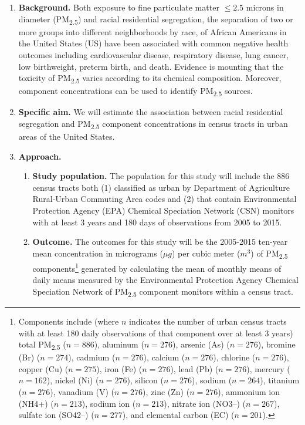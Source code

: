 \documentclass{article}\usepackage[]{graphicx}\usepackage[]{color}
\title{\vspace{-1cm}}
\author{\textbf{Midterm Examination} \\ \textbf{Katherine Wolf} \\ PH250C Spring 2020 \\ March 31, 2020}
\date{}
\begin{document}
\maketitle

\vspace{-.5cm}

\begin{enumerate}[label=\textbf{\arabic*.}]

  \item \textbf{Background.} Both exposure to fine particulate matter $\leq 2.5$ microns in diameter (PM\textsubscript{2.5}) and racial residential segregation, the separation of two or more groups into different neighborhoods by race, of African Americans in the United States (US) have been associated with common negative health outcomes including cardiovascular disease, respiratory disease, lung cancer, low birthweight, preterm birth, and death. Evidence is mounting that the toxicity of PM\textsubscript{2.5} varies according to its chemical composition. Moreover, component concentrations can be used to identify PM\textsubscript{2.5} sources.
  
  \item \textbf{Specific aim.} We will estimate the association between racial residential segregation and PM\textsubscript{2.5} component concentrations in census tracts in urban areas of the United States.
  \item \textbf{Approach.}
  
  \begin{enumerate}[label=\textbf{\alph*.}]
    
    \item \textbf{Study population.} The population for this study will include the 886 census tracts both (1) classified as urban by Department of Agriculture Rural-Urban Commuting Area codes and (2) that contain Environmental Protection Agency (EPA) Chemical Speciation Network (CSN) monitors with at least 3 years and 180 days of observations from 2005 to 2015.
    
    \item \textbf{Outcome.} The outcomes for this study will be the 2005-2015 ten-year mean concentration in micrograms ($\mu g$) per cubic meter ($m^3$) of PM\textsubscript{2.5} components\footnote{Components include (where $n$ indicates the number of urban census tracts with at least 180 daily observations of that component over at least 3 years) total PM\textsubscript{2.5} ($n=886$), aluminum ($n=276$), arsenic (As) ($n=276$), bromine (Br) ($n=274$), cadmium ($n=276$), calcium ($n=276$), chlorine ($n=276$), copper (Cu) ($n=275$), iron (Fe) ($n=276$), lead (Pb) ($n=276$), mercury ($n=162$), nickel (Ni) ($n=276$), silicon ($n=276$), sodium ($n=264$), titanium ($n=276$), vanadium (V) ($n=276$), zinc (Zn) ($n=276$), ammonium ion (NH4+) ($n=213$), sodium ion ($n=213$), nitrate ion (NO3–) ($n=267$), sulfate ion (SO42–) ($n=277$), and elemental carbon (EC) ($n=201$).} generated by calculating the mean of monthly means of daily means measured by the Environmental Protection Agency Chemical Speciation Network of PM\textsubscript{2.5} component monitors within a census tract.
    

\end{enumerate}
\end{enumerate}
\end{document}
